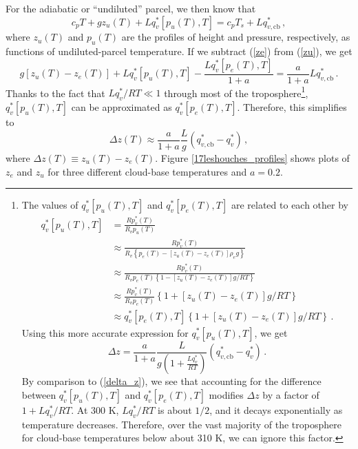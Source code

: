 \documentclass[12pt]{article}
\begin{document}
For the adiabatic or ``undiluted'' parcel, we then know that
\begin{equation}
c_p T + gz_u(T) + L q_v^*[p_u(T),T] = c_p T_s + L q_{v,\text{cb}}^* \, , \label{zu}
\end{equation}
where $z_u(T)$ and $p_u(T)$ are the profiles of height and pressure, respectively, as functions of undiluted-parcel temperature.  If we subtract (\ref{ze}) from (\ref{zu}), we get
\[
g\left[ z_u(T) - z_e(T) \right] + L q_v^*[p_u(T),T] - \frac{L q_v^*[p_e(T),T]}{1+a} = \frac{a}{1+a} L q_{v,\text{cb}}^* \, .
\]
Thanks to the fact that $L q_v^*/R T \ll 1$ through most of the troposphere\footnote{The values of $q_v^*[p_u(T),T]$ and $q_v^*[p_e(T),T]$ are related to each other by
\begin{align*}
q_v^*[p_u(T),T] &= \frac{R p_v^*(T)}{R_v p_u(T)} \\
&\approx \frac{R p_v^*(T)}{R_v \left\{ p_e(T) - [z_u(T)-z_e(T)] \rho_e g \right\}} \\
&\approx \frac{R p_v^*(T)}{R_v p_e(T) \left\{ 1 - [z_u(T)-z_e(T)] g / RT \right\}} \\
&\approx \frac{R p_v^*(T)}{R_v p_e(T)} \left\{ 1 + [z_u(T)-z_e(T)] g / RT \right\} \\
&\approx q_v^*[p_e(T),T] \left\{ 1 + [z_u(T)-z_e(T)] g / RT \right\} \, .
\end{align*}
Using this more accurate expression for $q_v^*[p_u(T),T]$, we get
\[
\Delta z = \frac{a}{1+a} \frac{L}{g \left( 1 + \frac{L q_v^*}{R T} \right)} \left( q_{v,\text{cb}}^* - q_v^* \right) \, .
\]
By comparison to (\ref{delta_z}), we see that accounting for the difference between $q_v^*[p_u(T),T]$ and $q_v^*[p_e(T),T]$ modifies $\Delta z$ by a factor of $1 + L q_v^*/RT$.  At 300 K, $L q_v^*/RT$ is about $1/2$, and it decays exponentially as temperature decreases.  Therefore, over the vast majority of the troposphere for cloud-base temperatures below about 310 K, we can ignore this factor.}, $q_v^*[p_u(T),T]$ can be approximated as $q_v^*[p_e(T),T]$.  Therefore, this simplifies to
\begin{equation}
\Delta z(T) \approx \frac{a}{1+a} \frac{L}{g} \left( q_{v,\text{cb}}^* - q_v^* \right) \, , \label{delta_z}
\end{equation}
where $\Delta z(T) \equiv z_u(T) - z_e(T)$.  Figure \ref{17leshouches_profiles} shows plots of $z_e$ and $z_u$ for three different cloud-base temperatures and $a=0.2$.
\end{document}
